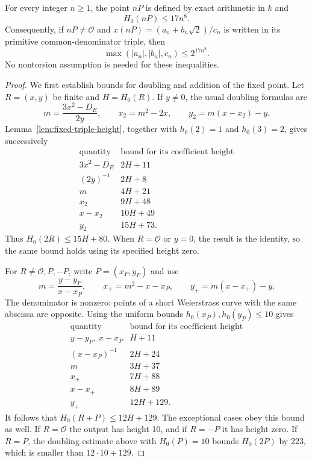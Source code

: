 \begin{lemma}\label{lem:fixed-point-binary-height}
For every integer $n\ge1$, the point $nP$ is defined by exact
arithmetic in $k$ and
\[
                         H_0(nP)\le17n^8.
\]
Consequently, if $nP\ne\mathcal O$ and
$x(nP)=(a_n+b_n\sqrt2)/c_n$ is written in its primitive
common-denominator triple, then
\[
               \max(|a_n|,|b_n|,c_n)\le2^{17n^8}.
\]
No nontorsion assumption is needed for these inequalities.
\end{lemma}
\begin{proof}
We first establish bounds for doubling and addition of the fixed point.
Let $R=(x,y)$ be finite and $H=H_0(R)$.  If $y\ne0$, the usual
doubling formulas are
\[
 m=\frac{3x^2-D_E}{2y},\qquad
 x_2=m^2-2x,\qquad y_2=m(x-x_2)-y.
\]
Lemma~\ref{lem:fixed-triple-height}, together with
$h_0(2)=1$ and $h_0(3)=2$, gives successively
\[
 \begin{array}{c|c}
 \text{quantity}&\text{bound for its coefficient height}\\ \hline
 3x^2-D_E&2H+11\\
 (2y)^{-1}&2H+8\\
 m&4H+21\\
 x_2&9H+48\\
 x-x_2&10H+49\\
 y_2&15H+73.
 \end{array}
\]
Thus $H_0(2R)\le15H+80$.  When $R=\mathcal O$ or $y=0$,
the result is the identity, so the same bound holds using its
specified height zero.

For $R\ne\mathcal O,P,-P$, write $P=(x_P,y_P)$ and use
\[
 m=\frac{y-y_P}{x-x_P},\qquad
 x_+=m^2-x-x_P,\qquad y_+=m(x-x_+)-y.
\]
The denominator is nonzero: points of a short Weierstrass curve with
the same abscissa are opposite.  Using the uniform bounds
$h_0(x_P),h_0(y_P)\le10$ gives
\[
 \begin{array}{c|c}
 \text{quantity}&\text{bound for its coefficient height}\\ \hline
 y-y_P,\ x-x_P&H+11\\
 (x-x_P)^{-1}&2H+24\\
 m&3H+37\\
 x_+&7H+88\\
 x-x_+&8H+89\\
 y_+&12H+129.
 \end{array}
\]
It follows that $H_0(R+P)\le12H+129$.  The exceptional cases
obey this bound as well.  If $R=\mathcal O$ the output has height
10, and if $R=-P$ it has height zero.  If $R=P$, the doubling
estimate above with $H_0(P)=10$ bounds $H_0(2P)$ by 223,
which is smaller than $12\cdot10+129$.


\end{proof}
